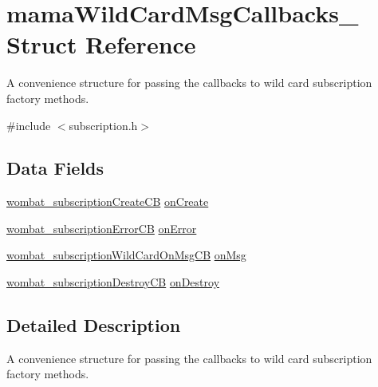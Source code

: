 \hypertarget{structmamaWildCardMsgCallbacks__}{
\section{mamaWildCardMsgCallbacks\_\- Struct Reference}
\label{structmamaWildCardMsgCallbacks__}
}


A convenience structure for passing the callbacks to wild card subscription factory methods.  


{\ttfamily \#include $<$subscription.h$>$}\subsection*{Data Fields}
\begin{DoxyCompactItemize}
\item 
\hyperlink{subscription_8h_a715ec03b0314ebe01a1f70b6d61c8a3d}{wombat\_\-subscriptionCreateCB} \hyperlink{structmamaWildCardMsgCallbacks___a6a89d07412f6626356849f1faf321bad}{onCreate}
\item 
\hyperlink{subscription_8h_af39bb2725f441fddc140d361d6e2a2b2}{wombat\_\-subscriptionErrorCB} \hyperlink{structmamaWildCardMsgCallbacks___a644e73c0be598eeef16d51a7730c34e7}{onError}
\item 
\hyperlink{subscription_8h_ae8a0a6cbb425ca815fa53028c42f53f7}{wombat\_\-subscriptionWildCardOnMsgCB} \hyperlink{structmamaWildCardMsgCallbacks___afe68d5087f5eeef855fd29c479164fd9}{onMsg}
\item 
\hyperlink{subscription_8h_a9a5da58e7f8781dabdf067beeeac2521}{wombat\_\-subscriptionDestroyCB} \hyperlink{structmamaWildCardMsgCallbacks___a8be537341d849e42077961442b60bcbf}{onDestroy}
\end{DoxyCompactItemize}


\subsection{Detailed Description}
A convenience structure for passing the callbacks to wild card subscription factory methods. 

